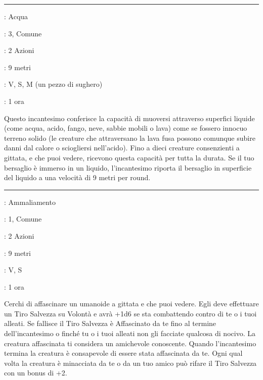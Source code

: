 \begin{multicols}{2}
\smallskip\noindent\rule{\linewidth}{2pt} \hypertarget{Camminare sull'Acqua}{}\medskip{}
\noindent
\begin{description}[noitemsep, topsep=0pt, parsep=0pt, partopsep=0pt, leftmargin=0cm, labelwidth=2.8cm]
	\item[\textbf{Lista di Magia}]: Acqua
	\item[\textbf{Livello}]: 3, Comune
	\item[\textbf{T. di Lancio}]: 2 Azioni
	\item[\textbf{Gittata}]: 9 metri
	\item[\textbf{Componenti}]: V, S, M (un pezzo di sughero)
	\item[\textbf{Durata}]: 1 ora
\end{description}

Questo incantesimo conferisce la capacità di muoversi attraverso superfici liquide (come acqua, acido, fango, neve, sabbie mobili o lava) come se fossero innocuo terreno solido (le creature che attraversano la lava fusa possono comunque subire danni dal calore o sciogliersi nell'acido). Fino a dieci creature consenzienti a gittata, e che puoi vedere, ricevono questa capacità per tutta la durata. Se il tuo bersaglio è immerso in un liquido, l'incantesimo riporta il bersaglio in superficie del liquido a una velocità di 9 metri per round.

\smallskip\noindent\rule{\linewidth}{2pt} \hypertarget{Charme su Persone}{}\medskip{}
\noindent
\begin{description}[noitemsep, topsep=0pt, parsep=0pt, partopsep=0pt, leftmargin=0cm, labelwidth=2.8cm]
	\item[\textbf{Lista di Magia}]: Ammaliamento
	\item[\textbf{Livello}]: 1, Comune
	\item[\textbf{T. di Lancio}]: 2 Azioni
	\item[\textbf{Gittata}]: 9 metri
	\item[\textbf{Componenti}]: V, S
	\item[\textbf{Durata}]: 1 ora
\end{description}

Cerchi di affascinare un umanoide a gittata e che puoi vedere. Egli deve effettuare un Tiro Salvezza su Volontà e avrà +1d6 se sta combattendo contro di te o i tuoi alleati. Se fallisce il Tiro Salvezza è Affascinato da te fino al termine dell'incantesimo o finché tu o i tuoi alleati non gli facciate qualcosa di nocivo. La creatura affascinata ti considera un amichevole conoscente. Quando l'incantesimo termina la creatura è consapevole di essere stata affascinata da te. Ogni qual volta la creatura è minacciata da te o da un tuo amico può rifare il Tiro Salvezza con un bonus di +2.


\end{multicols}
